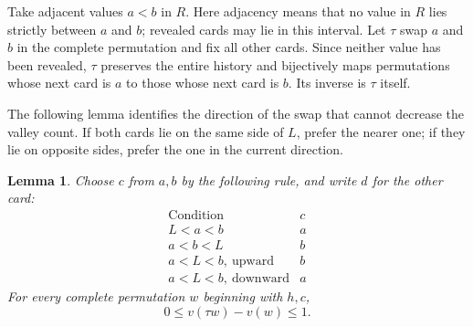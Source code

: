 \documentclass[10pt,a4paper]{amsart}
\numberwithin{equation}{section}
\newtheorem{lemma}[theorem]{Lemma}
\begin{document}
Take adjacent values $a<b$ in $R$. Here adjacency means that no value in $R$ lies strictly between $a$ and $b$; revealed cards may lie in this interval. Let $\tau$ swap $a$ and $b$ in the complete permutation and fix all other cards. Since neither value has been revealed, $\tau$ preserves the entire history and bijectively maps permutations whose next card is $a$ to those whose next card is $b$. Its inverse is $\tau$ itself.

The following lemma identifies the direction of the swap that cannot decrease the valley count. If both cards lie on the same side of $L$, prefer the nearer one; if they lie on opposite sides, prefer the one in the current direction.

\begin{lemma}\label{lem:swap}
Choose $c$ from $a,b$ by the following rule, and write $d$ for the other card:
\[
\begin{array}{c|c}
\text{Condition}&c\\\hline
L<a<b&a\\
a<b<L&b\\
a<L<b,\ \text{upward}&b\\
a<L<b,\ \text{downward}&a
\end{array}
\]
For every complete permutation $w$ beginning with $h,c$,
\begin{equation}\label{eq:swap}
 0\le v(\tau w)-v(w)\le1.
\end{equation}
\end{lemma}
\end{document}
